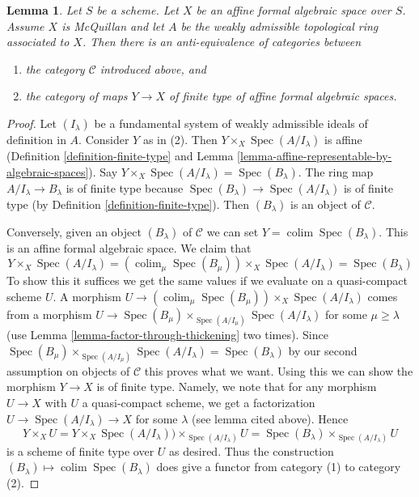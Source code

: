 \documentclass{stacks-project}
\theoremstyle{plain}
\newtheorem{lemma}[subsection]{Lemma}
\theoremstyle{definition}
\theoremstyle{remark}
\numberwithin{equation}{subsection}
\def\colim{\mathop{\mathrm{colim}}\nolimits}
\def\Spec{\mathop{\mathrm{Spec}}}
\begin{document}
\begin{lemma}
\label{lemma-category-affine-over}
Let $S$ be a scheme. Let $X$ be an affine formal algebraic space over $S$.
Assume $X$ is McQuillan and let $A$ be the weakly admissible topological
ring associated to $X$. Then there is an anti-equivalence of categories
between
\begin{enumerate}
\item the category $\mathcal{C}$ introduced above, and
\item the category of maps $Y \to X$ of finite type of
affine formal algebraic spaces.
\end{enumerate}
\end{lemma}

\begin{proof}
Let $(I_\lambda)$ be a fundamental system of weakly admissible ideals
of definition in $A$. Consider $Y$ as in (2). Then
$Y \times_X \Spec(A/I_\lambda)$ is affine
(Definition \ref{definition-finite-type}
and Lemma \ref{lemma-affine-representable-by-algebraic-spaces}).
Say $Y \times_X \Spec(A/I_\lambda) = \Spec(B_\lambda)$.
The ring map $A/I_\lambda \to B_\lambda$ is of finite type
because $\Spec(B_\lambda) \to \Spec(A/I_\lambda)$ is of
finite type
(by Definition \ref{definition-finite-type}).
Then $(B_\lambda)$ is an object of $\mathcal{C}$.

\medskip\noindent
Conversely, given an object $(B_\lambda)$ of $\mathcal{C}$ we can set
$Y = \colim \Spec(B_\lambda)$. This is an affine formal algebraic
space. We claim that
$$
Y \times_X \Spec(A/I_\lambda) =
\left(\colim_\mu \Spec(B_\mu)\right) \times_X \Spec(A/I_\lambda) =
\Spec(B_\lambda)
$$
To show this it suffices we get the same values if we evaluate
on a quasi-compact scheme $U$. A morphism
$U \to \left(\colim_\mu \Spec(B_\mu)\right) \times_X \Spec(A/I_\lambda)$
comes from a morphism
$U \to \Spec(B_\mu) \times_{\Spec(A/I_\mu)} \Spec(A/I_\lambda)$
for some $\mu \geq \lambda$ (use
Lemma \ref{lemma-factor-through-thickening} two times). Since
$\Spec(B_\mu) \times_{\Spec(A/I_\mu)} \Spec(A/I_\lambda) = \Spec(B_\lambda)$
by our second assumption on objects of $\mathcal{C}$
this proves what we want. Using this we can show the morphism
$Y \to X$ is of finite type. Namely, we note that
for any morphism $U \to X$ with $U$ a quasi-compact scheme, we get
a factorization $U \to \Spec(A/I_\lambda) \to X$ for some $\lambda$
(see lemma cited above). Hence
$$
Y \times_X U =
Y \times_X \Spec(A/I_\lambda)) \times_{\Spec(A/I_\lambda)} U =
\Spec(B_\lambda) \times_{\Spec(A/I_\lambda)} U
$$
is a scheme of finite type over $U$ as desired. Thus the construction
$(B_\lambda) \mapsto \colim \Spec(B_\lambda)$ does give a functor
from category (1) to category (2).


\end{proof}
\end{document}

